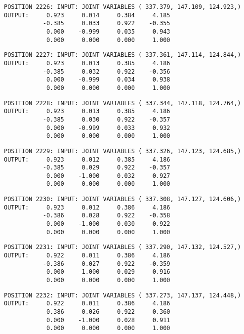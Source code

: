 \begin{verbatim}
POSITION 2226: INPUT: JOINT VARIABLES ( 337.379, 147.109, 124.923,)
OUTPUT:     0.923     0.014     0.384     4.185
           -0.385     0.033     0.922    -0.355
            0.000    -0.999     0.035     0.943
            0.000     0.000     0.000     1.000
\end{verbatim} \pagebreak[1]\begin{verbatim}
POSITION 2227: INPUT: JOINT VARIABLES ( 337.361, 147.114, 124.844,)
OUTPUT:     0.923     0.013     0.385     4.186
           -0.385     0.032     0.922    -0.356
            0.000    -0.999     0.034     0.938
            0.000     0.000     0.000     1.000
\end{verbatim} \pagebreak[1]\begin{verbatim}
POSITION 2228: INPUT: JOINT VARIABLES ( 337.344, 147.118, 124.764,)
OUTPUT:     0.923     0.013     0.385     4.186
           -0.385     0.030     0.922    -0.357
            0.000    -0.999     0.033     0.932
            0.000     0.000     0.000     1.000
\end{verbatim} \pagebreak[1]\begin{verbatim}
POSITION 2229: INPUT: JOINT VARIABLES ( 337.326, 147.123, 124.685,)
OUTPUT:     0.923     0.012     0.385     4.186
           -0.385     0.029     0.922    -0.357
            0.000    -1.000     0.032     0.927
            0.000     0.000     0.000     1.000
\end{verbatim} \pagebreak[1]\begin{verbatim}
POSITION 2230: INPUT: JOINT VARIABLES ( 337.308, 147.127, 124.606,)
OUTPUT:     0.923     0.012     0.386     4.186
           -0.386     0.028     0.922    -0.358
            0.000    -1.000     0.030     0.922
            0.000     0.000     0.000     1.000
\end{verbatim} \pagebreak[1]\begin{verbatim}
POSITION 2231: INPUT: JOINT VARIABLES ( 337.290, 147.132, 124.527,)
OUTPUT:     0.922     0.011     0.386     4.186
           -0.386     0.027     0.922    -0.359
            0.000    -1.000     0.029     0.916
            0.000     0.000     0.000     1.000
\end{verbatim} \pagebreak[1]\begin{verbatim}
POSITION 2232: INPUT: JOINT VARIABLES ( 337.273, 147.137, 124.448,)
OUTPUT:     0.922     0.011     0.386     4.186
           -0.386     0.026     0.922    -0.360
            0.000    -1.000     0.028     0.911
            0.000     0.000     0.000     1.000
\end{verbatim} \pagebreak[1]\begin{verbatim}

\end{verbatim}
